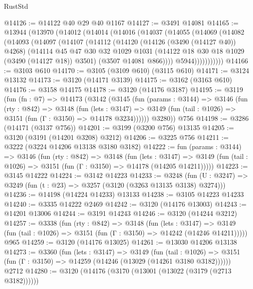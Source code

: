\begin{lexlean}{RustStd}
\begin{coremodule}
{\begin{coremodule}
{{{{{{{{{{{{{{{{{{{{{{{{{{@14126 := @14122 @40 @29 @40 @1167
@14127 := @3491 @14081
@14165 := @13944
    (@13970
      (@14012
        (@14014
          (@14016
            (@14037
              (@14055
                (@14069
                  (@14082
                    (@14093
                      (@14097
                        (@14107
                          (@14112
                            (@14120
                              (@14126 (@3490 (@14127 @40)) @4268)
                              (@14114
                                @45
                                @47
                                @30
                                @32
                                @1029
                                @1031
                                (@14122 @18 @30 @18 @1029 (@3490 (@14127 @18)) @3501)
                                (@3507 @14081 @866))))
                          @5944)))))))))))
@14166 := @3103 @610
@14170 := @3105 (@3109 @610) (@3115 @610)
@14171 := @3124 @13132
@14173 := @3120 (@14171 @3139)
@14175 := @3162 (@3163 @610)
@14176 := @3158 @14175
@14178 := @3120 (@14176 @3187)
@14195 := @3119
    (fun (fn : @7) =>
    @14173
      (@3142
        (@3145
          (fun (params : @3144) =>
          @3146
            (fun (rty : @842) =>
            @3148
              (fun (lets : @3147) =>
              @3149 (fun (tail : @1026) => @3151 (fun (Γ : @3150) => @14178 @3234))))))
        @3280))
    @756
@14198 := @3286 (@14171 (@3137 @756))
@14201 := @3199 (@3200 @756) @13135
@14205 := @3120 (@3191 (@14201 @3208) @3212)
@14206 := @3225 @756
@14211 := @3222 (@3224 @14206 @13138 @3180 @3182)
@14222 := fun (params : @3144) =>
  @3146
    (fun (rty : @842) =>
    @3148
      (fun (lets : @3147) =>
      @3149 (fun (tail : @1026) => @3151 (fun (Γ : @3150) => @14178 (@14205 @14211)))))
@14223 := @3145 @14222
@14224 := @3142 @14223
@14233 := @3248
    (fun (U : @3247) => @3249 (fun (t : @23) => @3257 (@3120 (@3263 @13135 @3138) @3274)))
@14236 := @14198 (@14224 @14233) @13133
@14238 := @3105 @14223 @14233
@14240 := @3335 @14222 @2469
@14242 := @3120 (@14176 @13003)
@14243 := @14201 @13006
@14244 := @3191 @14243
@14246 := @3120 (@14244 @3212)
@14257 := @3338
    (fun (rty : @842) =>
    @3148
      (fun (lets : @3147) =>
      @3149 (fun (tail : @1026) => @3151 (fun (Γ : @3150) => @14242 (@14246 @14211)))))
    @965
@14259 := @3120 (@14176 @13025)
@14261 := @13030 @14206 @13138
@14273 := @3360
    (fun (lets : @3147) =>
    @3149
      (fun (tail : @1026) =>
      @3151 (fun (Γ : @3150) => @14259 (@14246 (@13029 (@14261 @3180 @3182))))))
    @2712
@14280 := @3120 (@14176 (@3170 (@13001 (@13022 (@3179 (@2713 @3182))))))
}}}}}}}}}}}}}}}}}}}}}}}}}}
\end{coremodule}}
\end{coremodule}
\end{lexlean}
